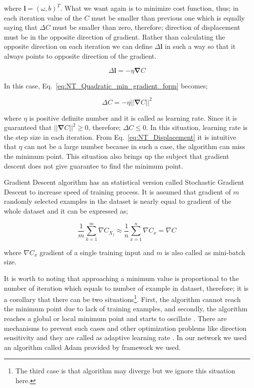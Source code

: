\documentclass[a4paper,times,12pt]{article}
\begin{document}
\noindent where $\boldsymbol{l} = (\omega, b)^T$. What we want again is to minimize cost function, thus; in each iteration value of the $C$ must be smaller than previous one which is equally saying that $\Delta{C}$ must be smaller than zero, therefore; direction of displacement must be in the opposite direction of gradient. Rather than calculating the opposite direction on each iteration we can define $\Delta{\boldsymbol{l}}$ in such a way so that it always points to opposite direction of the gradient.

\begin{equation}
\label{eq:NT_learning_rate}
\Delta{\boldsymbol{l}} = -\eta\boldsymbol{\nabla}C
\end{equation}

\noindent In this case, Eq.~\ref{eq:NT_Quadratic_min_gradient_form} becomes;

\begin{equation}
\label{eq:NT_Displacement}
\Delta{C} = -\eta ||\boldsymbol{\nabla}{C}||^2
\end{equation}

\noindent where $\eta$ is positive definite number and it is called as learning rate. Since it is guaranteed that $||\boldsymbol{\nabla}{C}||^2 \geq 0$, therefore; $\Delta{C} \leq 0$. In this situation, learning rate is the step size in each iteration. From Eq.~\ref{eq:NT_Displacement} it is intuitive that $\eta$ can not be a large number because in such a case, the algorithm can miss the minimum point. This situation also brings up the subject that gradient descent does not give guarantee to find the minimum point.

Gradient Descent algorithm has an statistical version called Stochastic Gradient Descent to increase speed of training process. It is assumed that gradient of  $m$ randomly selected examples in the dataset is nearly equal to gradient of the whole dataset and it can be expressed as;

\begin{equation}
\label{eq:NT_Stochastic}
\frac{1}{m} \sum\limits_{k = 1}^{m} \nabla{C_{X_j}} \approx \frac{1}{n}\sum\limits_{x = 1}^{n} \nabla{C_{x}} = \nabla{C}
\end{equation}

\noindent where $\nabla{C_x}$ gradient of a single training input and $m$ is also called as mini-batch size.

It is worth to noting that approaching a minimum value is proportional to the number of iteration which equals to number of example in dataset, therefore; it is a corollary that there can be two situations\footnote{The third case is that algorithm may diverge but we ignore this situation here.}. First, the algorithm cannot reach the minimum point due to lack of training examples, and secondly, the algorithm reaches a global or local minimum point and starts to oscillate \cite{zeiler2012adadelta}. There are mechanisms to prevent such cases and other optimization problems like direction sensitivity and they are called as adaptive learning rate \cite{mills2017deep}. In our network we used an algorithm called Adam \cite{kingma2014adam} provided by framework we used.  
\end{document}
